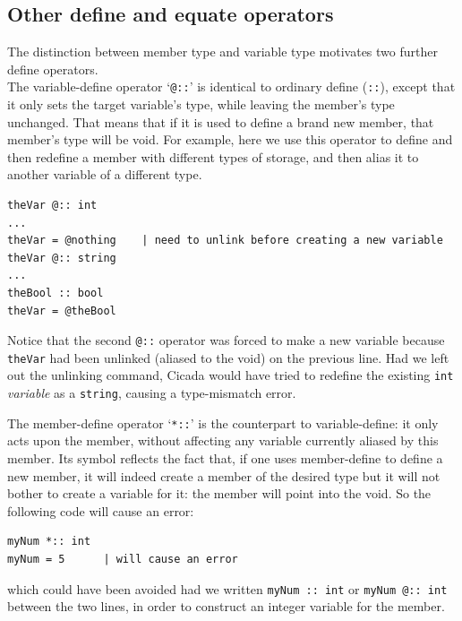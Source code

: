 \documentclass{article}
\newenvironment{code}{
       \begin{list}{}{
               \setlength{\leftmargin}{.4in}
               \setlength{\rightmargin}{0in}
               \setlength{\topsep}{.2in}
       }
       \small
       \item[] }
       { \end{list}   }
\begin{document}
\subsection{Other define and equate operators}

The distinction between member type and variable type motivates two further define operators.\\

The variable-define operator `\texttt{@::}' is identical to ordinary define (\texttt{::}), except that it only sets the target variable's type, while leaving the member's type unchanged.  That means that if it is used to define a brand new member, that member's type will be void.  For example, here we use this operator to define and then redefine a member with different types of storage, and then alias it to another variable of a different type.

\begin{code} \begin{verbatim}
theVar @:: int
...
theVar = @nothing    | need to unlink before creating a new variable
theVar @:: string
...
theBool :: bool
theVar = @theBool
\end{verbatim} \end{code}

\noindent Notice that the second \verb#@::# operator was forced to make a new variable because \verb#theVar# had been unlinked (aliased to the void) on the previous line.  Had we left out the unlinking command, Cicada would have tried to redefine the existing \verb#int# \emph{variable} as a \verb#string#, causing a type-mismatch error.

The member-define operator `\texttt{*::}' is the counterpart to variable-define:  it only acts upon the member, without affecting any variable currently aliased by this member.  Its symbol reflects the fact that, if one uses member-define to define a new member, it will indeed create a member of the desired type but it will not bother to create a variable for it:  the member will point into the void.  So the following code will cause an error:

\begin{code} \begin{verbatim}
myNum *:: int
myNum = 5      | will cause an error
\end{verbatim} \end{code}

\noindent which could have been avoided had we written \verb#myNum :: int# or \verb#myNum @:: int# between the two lines, in order to construct an integer variable for the member.
\end{document}
